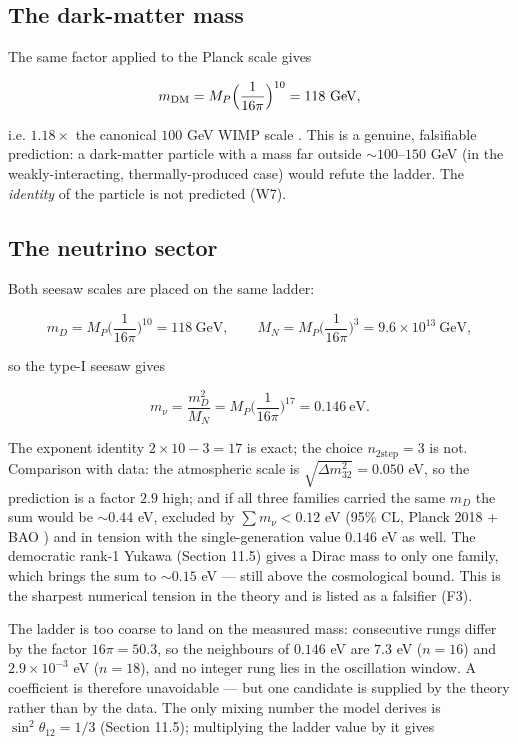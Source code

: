 \documentclass[aps,prd,amsmath,amssymb,superscriptaddress,longbibliography,floatfix,preprint]{revtex4-2}
\begin{document}
\subsection{The dark-matter mass}

The same factor applied to the Planck scale gives

\[m_{\rm DM} = M_P\Big(\frac{1}{16\pi}\Big)^{10} = 118\ \mathrm{GeV},\]

i.e. $1.18\times$ the canonical $100$ GeV WIMP scale \cite{ref45}. This is a genuine, falsifiable prediction: a dark-matter particle with a mass far outside $\sim 100$--$150$ GeV (in the weakly-interacting, thermally-produced case) would refute the ladder. The \emph{identity} of the particle is not predicted (W7).

\subsection{The neutrino sector}

Both seesaw scales are placed on the same ladder:

\[m_D = M_P\Big(\frac{1}{16\pi}\Big)^{10} = 118\ \mathrm{GeV},\qquad M_N = M_P\Big(\frac{1}{16\pi}\Big)^{3} = 9.6\times10^{13}\ \mathrm{GeV},\]

so the type-I seesaw gives

\[m_\nu = \frac{m_D^2}{M_N} = M_P\Big(\frac{1}{16\pi}\Big)^{17} = 0.146\ \mathrm{eV}.\]

The exponent identity $2\times10 - 3 = 17$ is exact; the choice $n_{2\text{step}} = 3$ is not. Comparison with data: the atmospheric scale is $\sqrt{\Delta m^2_{32}} = 0.050$ eV, so the prediction is a factor $2.9$ high; and if all three families carried the same $m_D$ the sum would be $\sim 0.44$ eV, excluded by $\sum m_\nu < 0.12$ eV (95\% CL, Planck 2018 + BAO \cite{ref14}) and in tension with the single-generation value $0.146$ eV as well. The democratic rank-1 Yukawa (Section 11.5) gives a Dirac mass to only one family, which brings the sum to $\sim 0.15$ eV --- still above the cosmological bound. This is the sharpest numerical tension in the theory and is listed as a falsifier (F3).

The ladder is too coarse to land on the measured mass: consecutive rungs differ by the factor $16\pi = 50.3$, so the neighbours of $0.146$ eV are $7.3$ eV ($n = 16$) and $2.9\times10^{-3}$ eV ($n = 18$), and no integer rung lies in the oscillation window. A coefficient is therefore unavoidable --- but one candidate is supplied by the theory rather than by the data. The only mixing number the model derives is $\sin^2\theta_{12} = 1/3$ (Section 11.5); multiplying the ladder value by it gives
\end{document}
